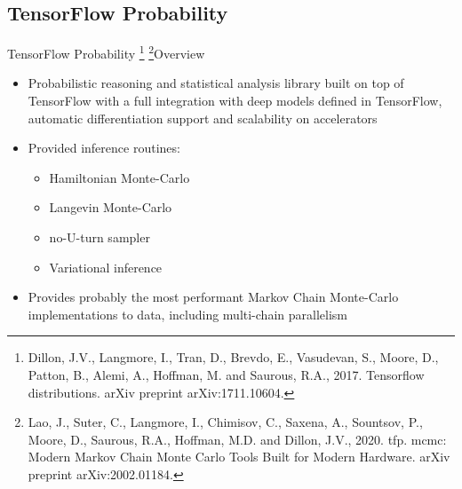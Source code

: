 \documentclass[AERbeamer%
              ,optEnglish%
              ,optBiber%
              ,optBibstyleAlphabetic%
              ,optBeamerClassicFormat%
              ]{AERlatex}%
\begin{document}
\subsection{TensorFlow Probability}
\begin{frame}[c]{TensorFlow Probability \footnote{Dillon, J.V., Langmore, I., Tran, D., Brevdo, E., Vasudevan, S.,
                                                  Moore, D., Patton, B., Alemi, A., Hoffman, M. and Saurous, R.A., 2017.
                                                  Tensorflow distributions. arXiv preprint arXiv:1711.10604.}
                                        \footnote{Lao, J., Suter, C., Langmore, I., Chimisov, C., Saxena, A., Sountsov, P.,
                                                  Moore, D., Saurous, R.A., Hoffman, M.D. and Dillon, J.V., 2020. tfp. mcmc:
                                                  Modern Markov Chain Monte Carlo Tools Built for Modern Hardware. arXiv
                                                  preprint arXiv:2002.01184.}}{Overview}
    \centering
    \begin{itemize}
        \item Probabilistic reasoning and statistical analysis library built on top of TensorFlow with a full
              integration with deep models defined in TensorFlow, automatic differentiation support and scalability
              on accelerators
        \item Provided inference routines:
        \begin{itemize}
            \item Hamiltonian Monte-Carlo
            \item Langevin Monte-Carlo
            \item no-U-turn sampler
            \item Variational inference
        \end{itemize}
        \item Provides probably the most performant Markov Chain Monte-Carlo implementations to data, including
              multi-chain parallelism
    \end{itemize}
\end{frame}
\end{document}

